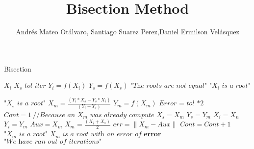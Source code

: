 \documentclass{article}
\title{Bisection Method}
\author{Andrés Mateo Otálvaro, Santiago Suarez Perez,Daniel Ermilson Velásquez}
\begin{document}
\maketitle
\begin{algorithm}
\caption{Bisection}\label{numerical methods}
\begin{algorithmic}[1]
\State $\textit{$X_i$}$\;
\State $\textit{$X_s$}$\;
\State $\textit{tol}$\;
\State $\textit{iter}$\;
\State $Y_i=f(X_i)$\;
\State$Y_s=f(X_s)$\;
		\State $\textit{"The roots are not equal"}$
		\State $\textit{"$X_i$ is a root"}$
	
		\State $\textit{"$X_s$ is a root"}$ 
	\Else
		\State $X_m=\frac{(Y_i*X_s - Y_s*X_i)}{(Y_i - Y_s)}$
		\State $Y_m=f(X_m)$
		\State $\textit{Error\ = tol *2}$ 
		\State $Cont=1\ \textit{//Because an $X_m$ was already compute}$
				\State $X_s=X_m$
				\State $Y_s=Y_m$
			\Else 
				\State $X_i=X_n$
				\State $Y_i=Y_m$
			\EndIf
				\State $Aux=X_m$
				\State $X_m=\frac{(X_i+X_s)}{2}$
				\State $err= \|X_m-Aux \| $
				\State $Cont=Cont+1$
		\EndWhile
			\State $\textit{"$X_m$ is a root"}$
			\State $\textit{$X_m$ is a root with an error of\ } \textbf{error}$ 
			\State $\textit{"We have ran out of iterations"}$
		\EndIf
	\EndIf
\EndProcedure
\end{algorithmic}
\end{algorithm}
\end{document}
